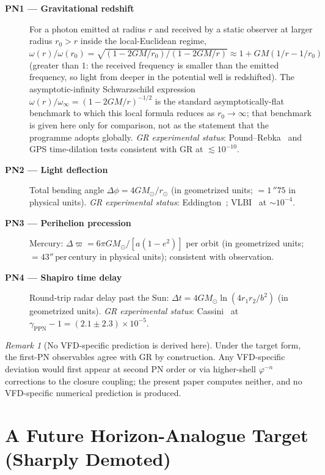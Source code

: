 \documentclass[12pt]{article}
\theoremstyle{definition}
\theoremstyle{remark}
\newtheorem{remark}[theorem]{Remark}
\newcommand{\farcs}{\mbox{$\,''\!$}}
\begin{document}
\begin{description}
\item[\textbf{PN1 --- Gravitational redshift}] For a photon emitted at radius $r$ and received by a static observer at larger radius $r_0 > r$ inside the local-Euclidean regime, $\omega(r)/\omega(r_0) = \sqrt{(1-2GM/r_0)/(1-2GM/r)} \approx 1 + GM(1/r - 1/r_0)$ (greater than $1$: the received frequency is smaller than the emitted frequency, so light from deeper in the potential well is redshifted). The asymptotic-infinity Schwarzschild expression $\omega(r)/\omega_\infty = (1 - 2GM/r)^{-1/2}$ is the standard asymptotically-flat benchmark to which this local formula reduces as $r_0 \to \infty$; that benchmark is given here only for comparison, not as the statement that the programme adopts globally. \emph{GR experimental status}: Pound--Rebka~\citep{PoundRebka1960} and GPS time-dilation tests consistent with GR at $\lesssim 10^{-10}$.
\item[\textbf{PN2 --- Light deflection}] Total bending angle $\Delta\phi = 4GM_\odot/r_\odot$ (in geometrized units; $= 1\farcs75$ in physical units). \emph{GR experimental status}: Eddington~\citep{Eddington1919}; VLBI~\citep{Fomalont2009} at $\sim 10^{-4}$.
\item[\textbf{PN3 --- Perihelion precession}] Mercury: $\Delta\varpi = 6\pi GM_\odot / [a(1-e^2)]$ per orbit (in geometrized units; $= 43''\,\mathrm{per\,century}$ in physical units); consistent with observation.
\item[\textbf{PN4 --- Shapiro time delay}] Round-trip radar delay past the Sun: $\Delta t = 4GM_\odot \ln(4 r_1 r_2 / b^2)$ (in geometrized units). \emph{GR experimental status}: Cassini~\citep{Bertotti2003} at $\gamma_{\mathrm{PPN}} - 1 = (2.1 \pm 2.3) \times 10^{-5}$.
\end{description}

\begin{remark}[No VFD-specific prediction is derived here]
Under the target form, the first-PN observables agree with GR by construction. Any VFD-specific deviation would first appear at second PN order or via higher-shell $\varphi^{-n}$ corrections to the closure coupling; the present paper computes neither, and no VFD-specific numerical prediction is produced.
\end{remark}

\section{A Future Horizon-Analogue Target (Sharply Demoted)}\label{sec:horizon}
\end{document}
